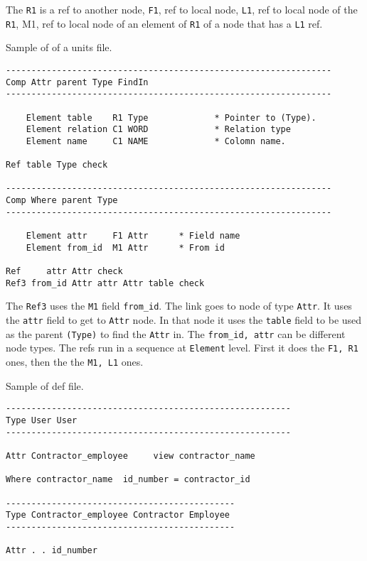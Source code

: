 The \texttt{R1} is a ref to another node, \texttt{F1}, ref to local
node, \texttt{L1}, ref to local node of the \texttt{R1}, M1, ref to
local node of an element of \texttt{R1} of a node that has a \texttt{L1}
ref.

Sample of of a units file.

\begin{verbatim}
----------------------------------------------------------------
Comp Attr parent Type FindIn
----------------------------------------------------------------

    Element table    R1 Type             * Pointer to (Type).
    Element relation C1 WORD             * Relation type
    Element name     C1 NAME             * Colomn name.

Ref table Type check

----------------------------------------------------------------
Comp Where parent Type
----------------------------------------------------------------

    Element attr     F1 Attr      * Field name
    Element from_id  M1 Attr      * From id

Ref     attr Attr check
Ref3 from_id Attr attr Attr table check
\end{verbatim}

The \texttt{Ref3} uses the \texttt{M1} field \texttt{from\_id}. The link
goes to node of type \texttt{Attr}. It uses the \texttt{attr} field to
get to \texttt{Attr} node. In that node it uses the \texttt{table} field
to be used as the parent \texttt{(Type)} to find the \texttt{Attr} in.
The \texttt{from\_id,\ attr} can be different node types. The refs run
in a sequence at \texttt{Element} level. First it does the
\texttt{F1,\ R1} ones, then the the \texttt{M1,\ L1} ones.

Sample of def file.

\begin{verbatim}
--------------------------------------------------------
Type User User
--------------------------------------------------------

Attr Contractor_employee     view contractor_name

Where contractor_name  id_number = contractor_id

---------------------------------------------
Type Contractor_employee Contractor Employee
---------------------------------------------

Attr . . id_number
\end{verbatim}


